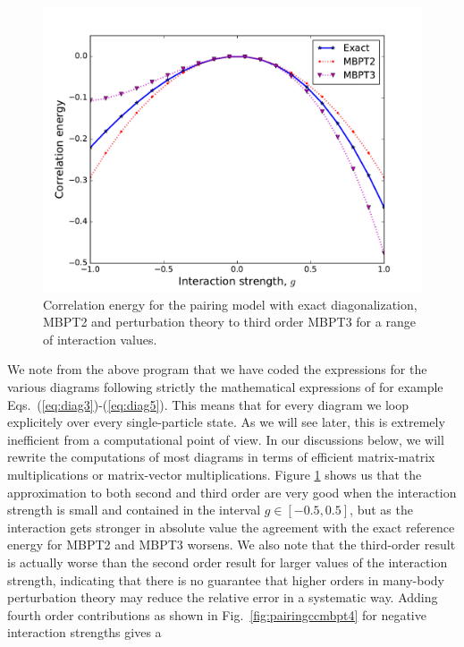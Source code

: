   \begin{figure}
    \includegraphics[width=\linewidth]{Chapter8-figures/perturbationtheory.pdf}
    \caption{Correlation energy for the pairing model with exact diagonalization, MBPT2 and perturbation theory to third order MBPT3 for a range of interaction values.}
    \label{fig:diagpairing}
  \end{figure}
We note from the above program that we have coded the expressions for the various diagrams
following strictly the mathematical expressions of for example Eqs.~(\ref{eq:diag3})-(\ref{eq:diag5}).
This means that for every diagram we loop explicitely  over every single-particle state. As we will
  see later, this is extremely inefficient from a computational point
  of view. In our discussions below, we will rewrite
  the computations of most diagrams in terms of efficient
  matrix-matrix multiplications or matrix-vector multiplications.  
  Figure \ref{fig:diagpairing} shows us that the approximation to both
  second and third order are very good when the interaction strength
  is small and contained in the interval $g\in[-0.5,0.5]$, but as the
  interaction gets stronger in absolute value the agreement  with the exact reference energy for  MBPT2 and MBPT3 worsens. We also note
  that the third-order result is actually worse than the second order
  result for larger values of the interaction strength, indicating
  that there is no guarantee that higher orders in many-body
  perturbation theory may reduce the relative error in a systematic
  way.  Adding fourth order contributions as shown in Fig.~\ref{fig:pairingccmbpt4}
  for negative interaction strengths gives a
